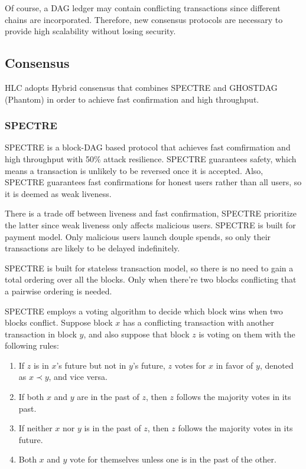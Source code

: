 \documentclass[a4paper,11pt]{article}
\begin{document}
Of course, a DAG ledger may contain conflicting transactions since different
chains are incorporated. Therefore, new consensus protocols are necessary to
provide high scalability without losing security.

\subsection{Consensus}
HLC adopts Hybrid consensus that combines SPECTRE and GHOSTDAG (Phantom) in order to achieve fast confirmation and high throughput.


\subsubsection{SPECTRE}
SPECTRE is a block-DAG based protocol that achieves fast comfirmation and high
throughput with 50\% attack resilience. SPECTRE guarantees safety, which means a
transaction is unlikely to be reversed once it is accepted. Also, SPECTRE guarantees fast confirmations for honest users rather than all users, so it is deemed as weak liveness.

There is a trade off between liveness and fast confirmation, SPECTRE prioritize
the latter since weak liveness only affects malicious users. SPECTRE is built
for payment model. Only malicious users launch douple spends, so only their
transactions are likely to be delayed indefinitely.

SPECTRE is built for stateless transaction model, so there is no need to gain a
total ordering over all the blocks. Only when there're two blocks conflicting
that a pairwise ordering is needed.

SPECTRE employs a voting algorithm to decide which block wins when two blocks
conflict. Suppose block $x$ has a conflicting transaction with another
transaction in block $y$, and also suppose that block $z$ is voting on them with
the following rules:


\begin{enumerate}
	\item If $z$ is in $x$'s future but not in $y$'s future, $z$ votes for
		$x$ in favor of $y$, denoted as $x \prec y$, and vice versa.
	\item If both $x$ and $y$ are in the past of $z$, then $z$ follows the majority votes in its past.
	\item If neither $x$ nor $y$ is in the past of $z$, then $z$ follows the majority votes in its future.
	\item Both $x$ and $y$ vote for themselves unless one is in the past of
		the other.
\end{enumerate}
\end{document}

